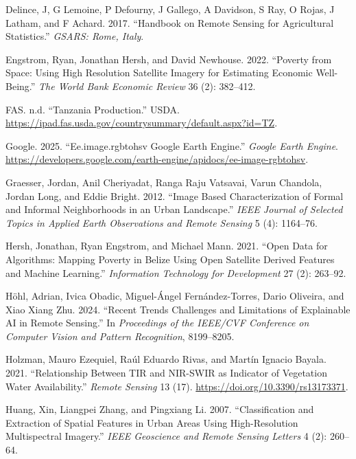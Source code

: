 \documentclass[
  journal,
  twocolumn]{IEEEtran}
\newlength{\cslhangindent}
\newlength{\cslentryspacingunit} %
\newenvironment{CSLReferences}[2] %
 {%
  \setlength{\parindent}{0pt}
  \ifodd #1
  \let\oldpar\par
  \def\par{\hangindent=\cslhangindent\oldpar}
  \fi
  \setlength{\parskip}{#2\cslentryspacingunit}
 }%
 {}
\begin{document}
\begin{CSLReferences}{1}{0}
\leavevmode{}%
Delince, J, G Lemoine, P Defourny, J Gallego, A Davidson, S Ray, O
Rojas, J Latham, and F Achard. 2017. {``Handbook on Remote Sensing for
Agricultural Statistics.''} \emph{GSARS: Rome, Italy}.

\leavevmode{}%
Engstrom, Ryan, Jonathan Hersh, and David Newhouse. 2022. {``Poverty
from Space: Using High Resolution Satellite Imagery for Estimating
Economic Well-Being.''} \emph{The World Bank Economic Review} 36 (2):
382--412.

\leavevmode{}%
FAS. n.d. {``Tanzania Production.''} USDA.
\url{https://ipad.fas.usda.gov/countrysummary/default.aspx?id=TZ}.

\leavevmode{}%
Google. 2025. {``Ee.image.rgbtohsv Google Earth Engine.''} \emph{Google
Earth Engine}.
\url{https://developers.google.com/earth-engine/apidocs/ee-image-rgbtohsv}.

\leavevmode{}%
Graesser, Jordan, Anil Cheriyadat, Ranga Raju Vatsavai, Varun Chandola,
Jordan Long, and Eddie Bright. 2012. {``Image Based Characterization of
Formal and Informal Neighborhoods in an Urban Landscape.''} \emph{IEEE
Journal of Selected Topics in Applied Earth Observations and Remote
Sensing} 5 (4): 1164--76.

\leavevmode{}%
Hersh, Jonathan, Ryan Engstrom, and Michael Mann. 2021. {``Open Data for
Algorithms: Mapping Poverty in Belize Using Open Satellite Derived
Features and Machine Learning.''} \emph{Information Technology for
Development} 27 (2): 263--92.

\leavevmode{}%
Höhl, Adrian, Ivica Obadic, Miguel-Ángel Fernández-Torres, Dario
Oliveira, and Xiao Xiang Zhu. 2024. {``Recent Trends Challenges and
Limitations of Explainable AI in Remote Sensing.''} In \emph{Proceedings
of the IEEE/CVF Conference on Computer Vision and Pattern Recognition},
8199--8205.

\leavevmode{}%
Holzman, Mauro Ezequiel, Raúl Eduardo Rivas, and Martín Ignacio Bayala.
2021. {``Relationship Between TIR and NIR-SWIR as Indicator of
Vegetation Water Availability.''} \emph{Remote Sensing} 13 (17).
\url{https://doi.org/10.3390/rs13173371}.

\leavevmode{}%
Huang, Xin, Liangpei Zhang, and Pingxiang Li. 2007. {``Classification
and Extraction of Spatial Features in Urban Areas Using High-Resolution
Multispectral Imagery.''} \emph{IEEE Geoscience and Remote Sensing
Letters} 4 (2): 260--64.


\end{CSLReferences}
\end{document}
